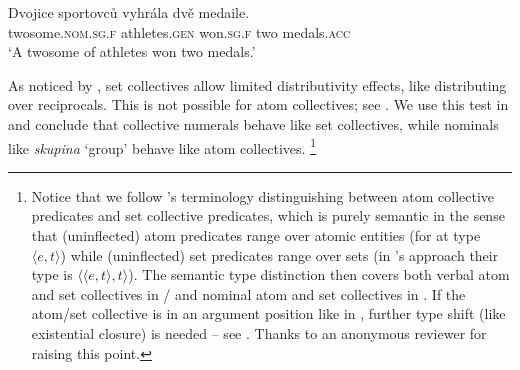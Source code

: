 \documentclass[output=paper,colorlinks,citecolor=brown,newtxmath]{langscibook}
\begin{document}
\ea\label{ex:line256-b}\label{ex:sec-sem-properties-dvojice-sportovcu}\gll Dvojice sportovců vyhrála dvě medaile.\\
 twosome.\textsc{nom.sg.f} athletes.\textsc{gen} won.\textsc{sg.f} two medals.\textsc{acc}\\
\glt `A twosome of athletes won two medals.'
\z\z

\noindent As noticed by \citet{Dotlacil2013}, set collectives allow limited distributivity effects, like distributing over reciprocals. This is not possible for atom collectives; see . We use this test in  and conclude that  collective numerals behave like set collectives, while nominals like \textit{skupina} `group' behave like atom collectives.%
\footnote{Notice that we follow \citeauthor{Winter2002}'s terminology distinguishing between atom collective predicates and set collective predicates, which is purely semantic in the sense that (uninflected) atom predicates range over atomic entities (for \citeauthor{Winter2002} at type $\langle e,t\rangle$) while (uninflected) set predicates range over sets (in \citeauthor{Winter2002}'s approach their type is $\langle \langle e,t\rangle, t \rangle$). The semantic type distinction then covers both verbal atom and set collectives in / and nominal atom and set collectives in . If the atom/set collective is in an argument position like in , further type shift (like existential closure) is needed -- see  . Thanks to an anonymous reviewer for raising this point.}

\ea\label{ex:line268} 
\z\z

\ea\label{ex:line271} 
\z\z
\end{document}
